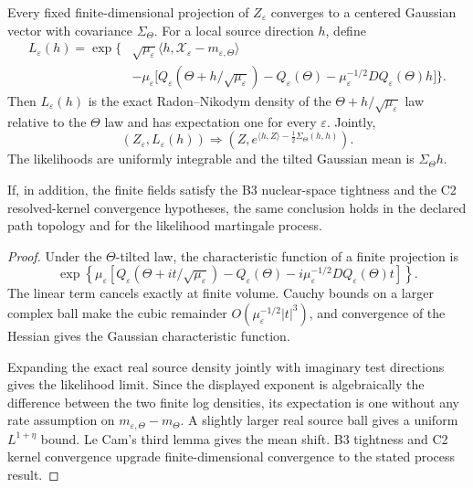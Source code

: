 \begin{theorem}
\label{thm:r3-d1-likelihood}
Every fixed finite-dimensional projection of \(Z_\varepsilon\) converges to a
centered Gaussian vector with covariance \(\Sigma_\Theta\).  For a local
source direction \(h\), define
\[
 \begin{aligned}
 L_\varepsilon(h)=\exp\Big\{&
 \sqrt{\mu_\varepsilon}
 \langle h,\mathcal X_\varepsilon-m_{\varepsilon,\Theta}\rangle\\
 &-\mu_\varepsilon\big[
 Q_\varepsilon(\Theta+h/\sqrt{\mu_\varepsilon})
 -Q_\varepsilon(\Theta)
 -\mu_\varepsilon^{-1/2}DQ_\varepsilon(\Theta)h
 \big]\Big\}.
 \end{aligned}
\]
Then \(L_\varepsilon(h)\) is the exact Radon--Nikodym density of the
\(\Theta+h/\sqrt{\mu_\varepsilon}\) law relative to the \(\Theta\) law and
has expectation one for every \(\varepsilon\).  Jointly,
\[
 (Z_\varepsilon,L_\varepsilon(h))
 \Rightarrow
 \left(Z,
 e^{\langle h,Z\rangle-\frac12\Sigma_\Theta(h,h)}
 \right).
\]
The likelihoods are uniformly integrable and the tilted Gaussian mean is
\(\Sigma_\Theta h\).

If, in addition, the finite fields satisfy the B3 nuclear-space tightness and
the C2 resolved-kernel convergence hypotheses, the same conclusion holds in
the declared path topology and for the likelihood martingale process.
\end{theorem}

\begin{proof}
Under the \(\Theta\)-tilted law, the characteristic function of a finite
projection is
\[
 \exp\left\{
 \mu_\varepsilon\left[
 Q_\varepsilon(\Theta+i t/\sqrt{\mu_\varepsilon})
 -Q_\varepsilon(\Theta)
 -i\mu_\varepsilon^{-1/2}DQ_\varepsilon(\Theta)t
 \right]\right\}.
\]
The linear term cancels exactly at finite volume.  Cauchy bounds on a larger
complex ball make the cubic remainder
\(O(\mu_\varepsilon^{-1/2}|t|^3)\), and convergence of the Hessian gives the
Gaussian characteristic function.

Expanding the exact real source density jointly with imaginary test directions
gives the likelihood limit.  Since the displayed exponent is algebraically
the difference between the two finite log densities, its expectation is one
without any rate assumption on
\(m_{\varepsilon,\Theta}-m_\Theta\).  A slightly larger real source ball gives
a uniform \(L^{1+\eta}\) bound.  Le Cam's third lemma gives the mean shift.
B3 tightness and C2 kernel convergence upgrade finite-dimensional convergence
to the stated process result.
\end{proof}

